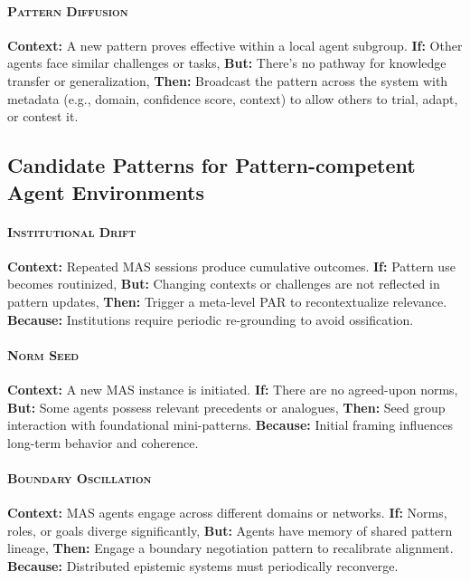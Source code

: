 \documentclass[acmlarge,timestamp]{acmart}
\begin{document}
{\paragraph*{{\scshape Pattern Diffusion}}

\noindent \textbf{Context:} A new pattern proves effective within a local agent subgroup.
 \textbf{If:} Other agents face similar challenges or tasks,
 \textbf{But:} There’s no pathway for knowledge transfer or generalization,
 \textbf{Then:} Broadcast the pattern across the system with metadata (e.g., domain, confidence score, context) to allow others to trial, adapt, or contest it.

\subsection*{Candidate Patterns for Pattern-competent Agent Environments}

\paragraph*{{\scshape Institutional Drift}}
\noindent \textbf{Context:} Repeated MAS sessions produce cumulative outcomes.
\textbf{If:} Pattern use becomes routinized,
\textbf{But:} Changing contexts or challenges are not reflected in pattern updates,
\textbf{Then:} Trigger a meta-level PAR to recontextualize relevance.
\textbf{Because:} Institutions require periodic re-grounding to avoid ossification.

\paragraph*{{\scshape Norm Seed}}
\noindent \textbf{Context:}  A new MAS instance is initiated.
\textbf{If:} There are no agreed-upon norms,
\textbf{But:} Some agents possess relevant precedents or analogues,
\textbf{Then:} Seed group interaction with foundational mini-patterns.
\textbf{Because:} Initial framing influences long-term behavior and coherence.

\paragraph*{{\scshape Boundary Oscillation}}
\noindent \textbf{Context:}  MAS agents engage across different domains or networks.
\textbf{If:} Norms, roles, or goals diverge significantly,
\textbf{But:} Agents have memory of shared pattern lineage,
\textbf{Then:} Engage a boundary negotiation pattern to recalibrate alignment.
\textbf{Because:} Distributed epistemic systems must periodically reconverge.

}
\end{document}
